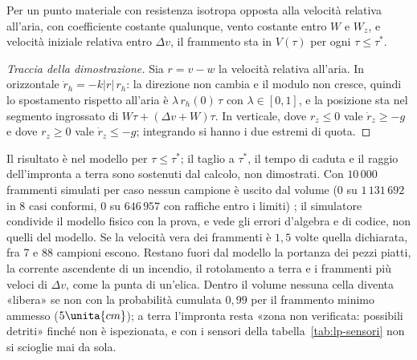 \begin{proposizione}\label{prop:lp-detriti}
Per un punto materiale con resistenza isotropa opposta alla velocità relativa all'aria, con coefficiente costante qualunque, vento costante entro $W$ e $W_z$, e velocità iniziale relativa entro $\Delta v$, il frammento sta in $V(\tau)$ per ogni $\tau\le\tau^*$.
\end{proposizione}
\begin{proof}[Traccia della dimostrazione]
Sia $r=v-w$ la velocità relativa all'aria. In orizzontale $\dot r_h=-k|r|\,r_h$: la direzione non cambia e il modulo non cresce, quindi lo spostamento rispetto all'aria è $\lambda\,r_h(0)\,\tau$ con $\lambda\in[0,1]$, e la posizione sta nel segmento ingrossato di $W\tau+(\Delta v+W)\tau$. In verticale, dove $r_z\le0$ vale $\dot r_z\ge-g$ e dove $r_z\ge0$ vale $\dot r_z\le-g$; integrando si hanno i due estremi di quota.
\end{proof}
Il risultato è  nel modello per $\tau\le\tau^*$; il taglio a $\tau^*$, il tempo di caduta e il raggio dell'impronta a terra sono sostenuti dal calcolo, non dimostrati. Con $10\,000$ frammenti simulati per caso nessun campione è uscito dal volume (0 su $1\,131\,692$ in 8 casi conformi, 0 su $646\,957$ con raffiche entro i limiti) ; il simulatore condivide il modello fisico con la prova, e vede gli errori d'algebra e di codice, non quelli del modello. Se la velocità vera dei frammenti è $1{,}5$ volte quella dichiarata, fra 7 e 88 campioni escono. Restano fuori dal modello la portanza dei pezzi piatti, la corrente ascendente di un incendio, il rotolamento a terra e i frammenti più veloci di $\Delta v$, come la punta di un'elica. Dentro il volume nessuna cella diventa «libera» se non con la probabilità cumulata $0{,}99$ per il frammento minimo ammesso ($5\unita{cm}$); a terra l'impronta resta «zona non verificata: possibili detriti» finché non è ispezionata, e con i sensori della tabella~\ref{tab:lp-sensori} non si scioglie mai da sola.

